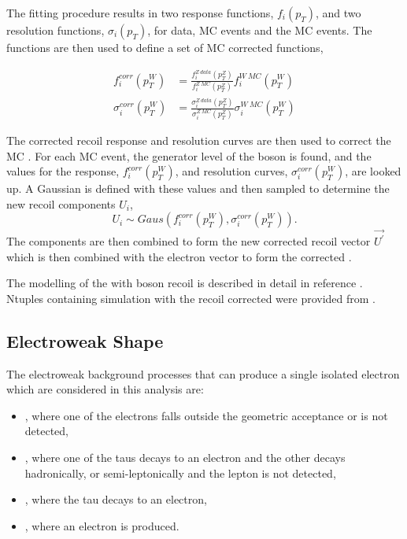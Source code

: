 The fitting procedure results in two response functions, $f_i(p_T)$, and two
resolution functions, $\sigma_i(p_T)$, for \PZ data, \PZ MC events and
the \PW MC events. The functions are then used to define a set of \PW
MC corrected functions, 

\begin{align}
f^{corr}_i (p^{W}_T)      
  &= \frac{ f^{Z\ data}_i (p^{Z}_T) }
          { f^{Z\ MC}_i (p^{Z}_T) }
          f^{W\ MC}_i (p^{W}_T) \\
\sigma^{corr}_i (p^{W}_T) 
  &= \frac{ \sigma^{Z\ data}_i (p^{Z}_T) }
          { \sigma^{Z\ MC}_i (p^{Z}_T) }
          \sigma^{W\ MC}_i (p^{W}_T) 
\end{align}

The corrected recoil response and resolution curves are then used to correct the
\PW MC \ETm. For each \PW MC event, the generator level \pT of the boson is
found, and the values for the response, $f^{corr}_i (p^{W}_T)$, and
resolution curves, $\sigma^{corr}_i (p^{W}_T) $, are looked up. A Gaussian is
defined with these values and then sampled to determine the new recoil
components $U_i$,
\begin{equation}
U_i \sim Gaus(f^{corr}_i (p^{W}_T), \sigma^{corr}_i (p^{W}_T) ).
\end{equation}
The components are then combined to form the new corrected recoil vector
$\vec{U^{\prime}}$ which is then combined with the electron vector to
form the corrected \ETm\cite{bauer2010modeling}.

The modelling of the \HepProcess{\PW\to\Plepton\Pnu} \ETm with boson recoil is
described in detail in reference \cite{bauer2010modeling}. 
Ntuples containing \HepProcess{\PW\to\Pelectron\Pnu} simulation with the recoil corrected \ETm were
provided from \cite{alcaraz2010updated}.

\subsection{{Electroweak} \ETm Shape}
The electroweak background processes that can produce a single isolated
electron which are considered in this analysis are:
\begin{itemize}
\item \HepProcess{\PZ\to\Pelectron\APelectron}, where one of the electrons falls
outside the geometric acceptance or is not detected,
\item \HepProcess{\PZ\to\Ptauon\APtauon}, where one of the taus decays
to an electron and the other decays hadronically, or semi-leptonically and the lepton
is not detected,
\item \HepProcess{\PW\to\Ptau\Pnu}, where the tau decays to an electron,
\item \HepProcess{\Ptop\APtop}, where an electron is produced.
\end{itemize}

